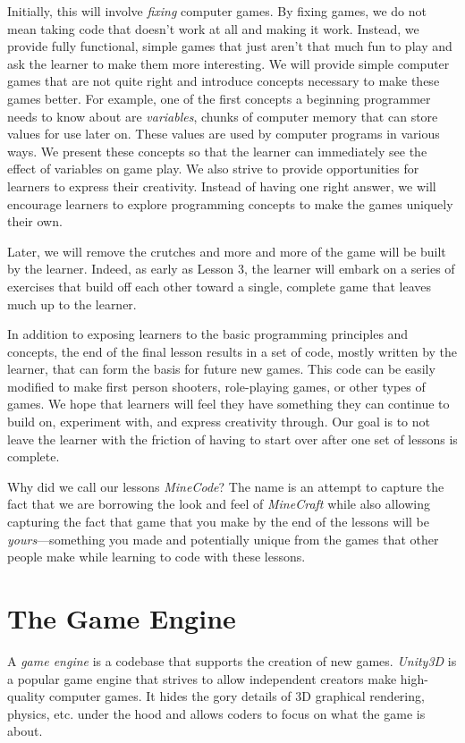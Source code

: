 \documentclass{article}
\begin{document}
Initially, this will involve {\em fixing} computer games.
By fixing games, we do not mean taking code that doesn't work at all and making it work. 
Instead, we provide fully functional, simple games that just aren't that much fun to play and ask the learner to make them more interesting.
We will provide simple computer games that are not quite right and introduce concepts necessary to make these games better.
For example, one of the first concepts a beginning programmer needs to know about are {\em variables}, chunks of computer memory that can store values for use later on.
These values are used by computer programs in various ways.
We present these concepts so that the learner can immediately see the effect of variables on game play.
We also strive to provide opportunities for learners to express their creativity.
Instead of having one right answer, we will encourage learners to explore programming concepts to make the games uniquely their own.

Later, we will remove the crutches and more and more of the game will be built by the learner.
Indeed, as early as Lesson 3, the learner will embark on a series of exercises that build off each other toward a single, complete game that leaves much up to the learner.

In addition to exposing learners to the basic programming principles and concepts, the end of the final lesson results in a set of code, mostly written by the learner, that can form the basis for future new games.
This code can be easily modified to make first person shooters, role-playing games, or other types of games.
We hope that learners will feel they have something they can continue to build on, experiment with, and express creativity through.
Our goal is to not leave the learner with the friction of having to start over after one set of lessons is complete.

Why did we call our lessons {\em MineCode}? 
The name is an attempt to capture the fact that we are borrowing the look and feel of {\em MineCraft} while also allowing capturing the fact that game that you make by the end of the lessons will be {\em yours}---something you made and potentially unique from the games that other people make while learning to code with these lessons.

\section{The Game Engine}

A {\em game engine} is a codebase that supports the creation of new games.
{\em Unity3D} is a popular game engine that strives to allow independent creators make high-quality computer games. 
It hides the gory details of 3D graphical rendering, physics, etc. under the hood and allows coders to focus on what the game is about.
\end{document}
